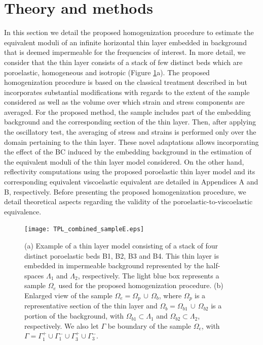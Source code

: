 \documentclass[draft]{agujournal2019}
\begin{document}
\section{Theory and methods}
In this section we detail the proposed homogenization procedure to estimate the equivalent moduli of an infinite horizontal thin layer embedded in background that is deemed impermeable for the frequencies of interest.  
In more detail, we consider that the thin layer consists of a stack of few distinct beds which are poroelastic, homogeneous and isotropic (Figure \ref{fig.1}a). 
The proposed homogenization procedure is based on the classical treatment described in  but incorporates substantial modifications with regards to
the extent of the sample considered as well as the volume over which strain and stress components are averaged. For the proposed method, the sample includes part of the embedding background and the corresponding section of the thin layer. Then, after applying the oscillatory test, the averaging of stress and strains is performed only over the domain pertaining to the thin layer.
These novel adaptations allows
incorporating the effect of the BC induced by the embedding background in the estimation of the equivalent moduli of the thin layer model considered. 
On the other hand, reflectivity computations using the proposed poroelastic thin layer model  and its corresponding equivalent viscoelastic equivalent are detailed in Appendices A and B, respectively. Before presenting the proposed homogenization procedure,
we detail theoretical aspects regarding the validity of the poroelastic-to-viscoelastic equivalence.

\begin{figure}[!ht]
\centering
        \texttt{[image: TPL\_combined\_sampleE.eps]}
\caption{ (a) Example of a thin layer model consisting of a stack of four distinct poroelastic beds B1, B2, B3 and B4. This thin layer is embedded in impermeable background represented by the half-spaces $\Lambda_1$ and $\Lambda_2$, respectively. The light blue box represents a sample $\Omega_e$ used for the proposed homogenization procedure. (b) Enlarged view of the sample $\Omega_e = \Omega_p \, \cup \, \Omega_b$, where  $\Omega_p$ is a representative section of the thin layer and  $\Omega_b= \Omega_{b1}  \, \cup \, \Omega_{b2}$ is a portion of the background, with $\Omega_{b1} \subset \Lambda_1$ and $\Omega_{b2} \subset \Lambda_2$, respectively. We also let $\Gamma$ be boundary of the  sample $\Omega_e$, with  $\Gamma = \Gamma_1^+ \cup \Gamma_1^- \cup \Gamma_3^+ \cup \Gamma_3^-$.
}
\label{fig.1}
\end{figure}
\end{document}
